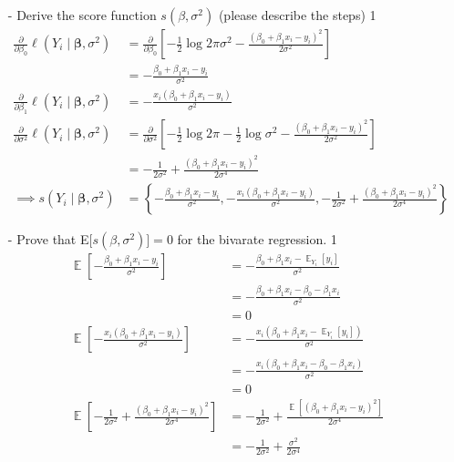 \documentclass[letterpaper,12pt]{article}
\numberwithin{equation}{section}
\numberwithin{equation}{section}
\DeclareMathOperator*{\E}{\mathbb{E}}
\newcommand{\solutions}{1}
\begin{document}
\begin{itemize}
\item[-] Derive the score function $s(\beta, \sigma^2)$ (please describe the steps)
\if \solutions1
{\color{red}
\begin{align*}
  \frac{\partial}{\partial \beta_0} \ell(Y_i \mid \bm \beta, \sigma^2)
  &= \frac{\partial}{\partial \beta_0} \left[-\frac{1}{2} \log 2\pi\sigma^2 - \frac{(\beta_0 + \beta_1 x_i - y_i)^2}{2 \sigma^2} \right]
  \\
  &=  - \frac{\beta_0 + \beta_1 x_i - y_i}{\sigma^2}
  \\
  \frac{\partial}{\partial \beta_1} \ell(Y_i \mid \bm \beta, \sigma^2)
  &= - \frac{x_i (\beta_0 + \beta_1 x_i - y_i)}{\sigma^2}
  \\
  \frac{\partial}{\partial \sigma^2} \ell(Y_i \mid \bm \beta, \sigma^2)
  &=  \frac{\partial}{\partial \sigma^2} \left[-\frac{1}{2} \log 2\pi - \frac{1}{2}\log \sigma^2 - \frac{(\beta_0 + \beta_1 x_i - y_i)^2}{2 \sigma^2} \right]
  \\
  &= - \frac{1}{2 \sigma^2} + \frac{(\beta_0 + \beta_1 x_i - y_i)^2}{2 \sigma^4}
  \\
  \implies s(Y_i \mid \bm \beta, \sigma^2)
  &=
  \left\{
  - \frac{\beta_0 + \beta_1 x_i - y_i}{\sigma^2} ,
  - \frac{x_i (\beta_0 + \beta_1 x_i - y_i)}{\sigma^2} ,
  - \frac{1}{2 \sigma^2} + \frac{(\beta_0 + \beta_1 x_i - y_i)^2}{2 \sigma^4}
  \right\}
\end{align*}
}
\fi
\item[-] Prove that E[$s(\beta ,\sigma^2)] = 0$ for the bivarate regression.
\if \solutions1
{\color{red}
\begin{align*}
  \E\left[- \frac{\beta_0 + \beta_1 x_i - y_i}{\sigma^2} \right]
  &= - \frac{\beta_0 + \beta_1 x_i - \E_{Y_i}[y_i]}{\sigma^2} \\
  &= - \frac{\beta_0 + \beta_1 x_i - \beta_0 - \beta_1 x_i}{\sigma^2} \\
  &= 0 \\
  \E\left[- \frac{x_i(\beta_0 + \beta_1 x_i - y_i)}{\sigma^2} \right]
  &= - \frac{x_i(\beta_0 + \beta_1 x_i - \E_{Y_i}[y_i])}{\sigma^2} \\
  &= - \frac{x_i(\beta_0 + \beta_1 x_i - \beta_0 - \beta_1 x_i)}{\sigma^2} \\
  &= 0 \\
  \E\left[- \frac{1}{2 \sigma^2} + \frac{(\beta_0 + \beta_1 x_i - y_i)^2}{2 \sigma^4} \right]
  &= - \frac{1}{2 \sigma^2} + \frac{\E\left[(\beta_0 + \beta_1 x_i - y_i)^2\right]}{2 \sigma^4}
  \\
  &= - \frac{1}{2 \sigma^2} + \frac{\sigma^2}{2 \sigma^4}

\end{align*}}
\end{itemize}
\end{document}
